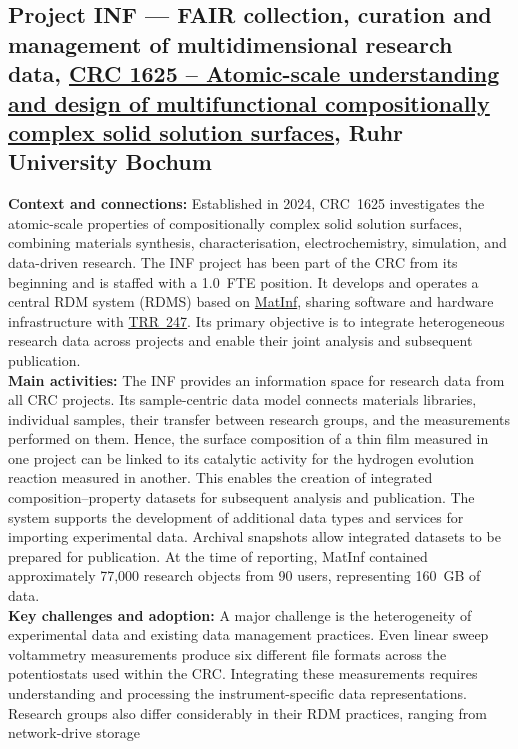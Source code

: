 \documentclass{eceasst}
\begin{document}
\subsection{Project INF --- FAIR collection, curation and management of multidimensional research data, \href{https://gepris.dfg.de/gepris/projekt/506711657?language=en}{CRC 1625 – Atomic-scale understanding and design of multifunctional compositionally complex solid solution surfaces}, Ruhr University Bochum}
\label{subsec:crc1625}
\noindent\textbf{Context and connections:}
Established in 2024, CRC~1625 investigates the
atomic-scale properties of compositionally complex
solid solution surfaces, combining materials synthesis,
characterisation, electrochemistry, simulation, and
data-driven research.
The INF project has been part of the CRC from its
beginning and is staffed with a 1.0~FTE position.
It develops and operates a central RDM system (RDMS) based on
\href{https://matinf.pro/}{MatInf}, sharing software and hardware infrastructure with \hyperref[subsec:trr247]{TRR~247}.
Its primary objective is to integrate heterogeneous
research data across projects and enable their
joint analysis and subsequent publication.
\\
\noindent\textbf{Main activities:}
The INF provides an information space for
research data from all CRC projects. Its sample-centric
data model connects materials libraries, individual
samples, their transfer between research groups,
and the measurements performed on them.
Hence, the surface composition of a thin film
measured in one project can be linked to its catalytic
activity for the hydrogen evolution reaction
measured in another. This enables the creation of
integrated composition--property datasets for
subsequent analysis and publication.
The system supports the development of additional
data types and services for importing experimental
data. Archival snapshots allow integrated datasets
to be prepared for publication. At the time of
reporting, MatInf contained approximately 77,000
research objects from 90 users, representing
160~GB of data.
\\
\noindent\textbf{Key challenges and adoption:}
A major challenge is the heterogeneity of experimental
data and existing data management practices. Even
linear sweep voltammetry measurements produce six
different file formats across the potentiostats
used within the CRC. Integrating these measurements
requires understanding and processing the
instrument-specific data representations.
Research groups also differ considerably in their
RDM practices, ranging from network-drive storage
\end{document}
